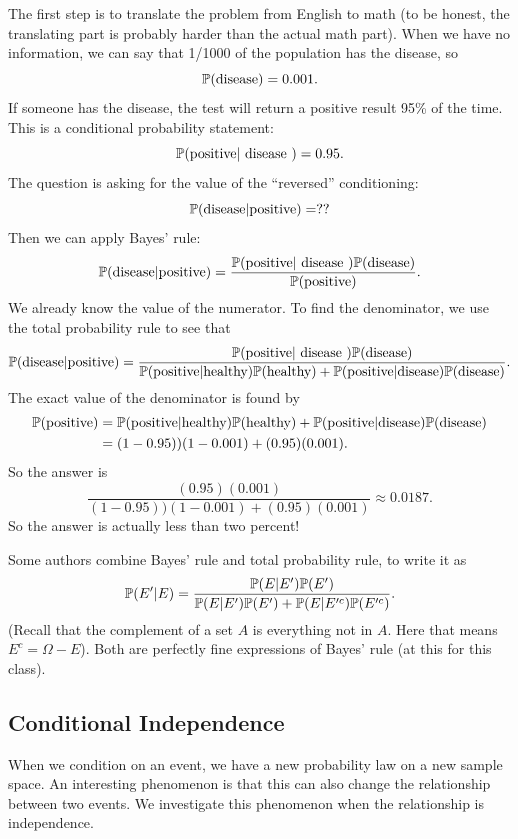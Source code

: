 \documentclass{ximera}
\begin{document}
The first step is to translate the problem from English to math (to be honest, the translating part is probably harder than the actual math part). When we have no information, we can say that 1/1000 of the population has the disease, so
$$
\mathbb{P}(\text{disease})=0.001.
$$
If someone has the disease, the test will return a positive result 95\% of the time. This is a conditional probability statement:
$$
\mathbb{P}(\text{positive} \vert \text{ disease }) =0.95.
$$
The question is asking for the value of the ``reversed'' conditioning:
$$
\mathbb{P}( \text{disease} \vert \text{positive}) = ??
$$
Then we can apply Bayes' rule:
$$
\mathbb{P}( \text{disease} \vert \text{positive}) = \frac{\mathbb{P}(\text{positive} \vert \text{ disease }) \mathbb{P}(\text{disease})}{ \mathbb{P}(\text{positive}) }.
$$
We already know the value of the numerator. To find the denominator, we use the total probability rule to see that
$$
\mathbb{P}( \text{disease} \vert \text{positive}) = \frac{\mathbb{P}(\text{positive} \vert \text{ disease }) \mathbb{P}(\text{disease})}{ \mathbb{P}(\text{positive} \vert \text{healthy}) \mathbb{P}(\text{healthy}) + \mathbb{P}(\text{positive} \vert \text{disease}) \mathbb{P}(\text{disease}) }.
$$
The exact value of the denominator is found by 
\begin{align*}
\mathbb{P}(\text{positive}) &= \mathbb{P}(\text{positive} \vert \text{healthy}) \mathbb{P}(\text{healthy}) + \mathbb{P}(\text{positive} \vert \text{disease}) \mathbb{P}(\text{disease}) \\
&= (1-0.95)) (1-0.001) + (0.95) (0.001).
\end{align*}
So the answer is
$$
\frac{(0.95) (0.001)}{(1-0.95)) (1-0.001) + (0.95) (0.001)} \approx 0.0187.
$$
So the answer is actually less than two percent!


Some authors combine Bayes' rule and total probability rule, to write it as
$$
\mathbb{P}(E'\vert E) = \frac{\mathbb{P}(E\vert E') \mathbb{P}(E') }{\mathbb{P}(E\vert E') \mathbb{P}(E')  + \mathbb{P}(E\vert E'^c) \mathbb{P}(E'^c)  }.
$$
(Recall that the complement of a set $A$ is everything not in $A$. Here that means $E^c = \Omega - E$).
Both are perfectly fine expressions of Bayes' rule (at this for this class). 

\subsection{Conditional Independence}
When we condition on an event, we have a new probability law on a new sample space. An interesting phenomenon is that this can also change the relationship between two events. We investigate this phenomenon when the relationship is independence.
\end{document}
